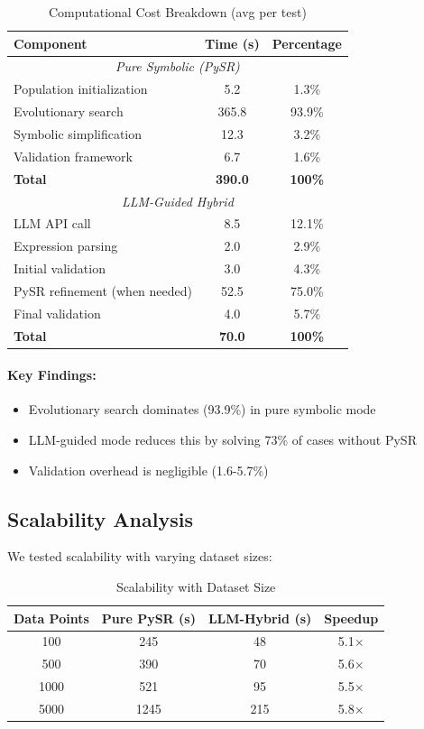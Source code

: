 \begin{table}[H]
\centering
\caption{Computational Cost Breakdown (avg per test)}
\label{tab:timing_breakdown}
\begin{tabular}{@{}lcc@{}}
\toprule
\textbf{Component} & \textbf{Time (s)} & \textbf{Percentage} \\
\midrule
\multicolumn{3}{c}{\textit{Pure Symbolic (PySR)}} \\
\midrule
Population initialization & 5.2 & 1.3\% \\
Evolutionary search & 365.8 & 93.9\% \\
Symbolic simplification & 12.3 & 3.2\% \\
Validation framework & 6.7 & 1.6\% \\
\midrule
\textbf{Total} & \textbf{390.0} & \textbf{100\%} \\
\midrule
\multicolumn{3}{c}{\textit{LLM-Guided Hybrid}} \\
\midrule
LLM API call & 8.5 & 12.1\% \\
Expression parsing & 2.0 & 2.9\% \\
Initial validation & 3.0 & 4.3\% \\
PySR refinement (when needed) & 52.5 & 75.0\% \\
Final validation & 4.0 & 5.7\% \\
\midrule
\textbf{Total} & \textbf{70.0} & \textbf{100\%} \\
\bottomrule
\end{tabular}
\end{table}

\paragraph{Key Findings:}
\begin{itemize}
\item Evolutionary search dominates (93.9\%) in pure symbolic mode
\item LLM-guided mode reduces this by solving 73\% of cases without PySR
\item Validation overhead is negligible (1.6-5.7\%)
\end{itemize}

\subsection{Scalability Analysis}

We tested scalability with varying dataset sizes:

\begin{table}[H]
\centering
\caption{Scalability with Dataset Size}
\label{tab:scalability}
\begin{tabular}{@{}cccc@{}}
\toprule
\textbf{Data Points} & \textbf{Pure PySR (s)} & \textbf{LLM-Hybrid (s)} & \textbf{Speedup} \\
\midrule
100 & 245 & 48 & 5.1$\times$ \\
500 & 390 & 70 & 5.6$\times$ \\
1000 & 521 & 95 & 5.5$\times$ \\
5000 & 1245 & 215 & 5.8$\times$ \\
\bottomrule
\end{tabular}
\end{table}

